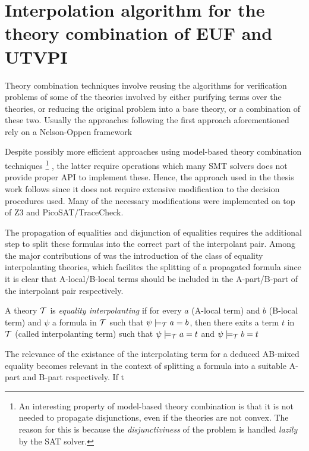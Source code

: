 \chapter{Interpolation algorithm for the theory combination of EUF and UTVPI}

Theory combination techniques involve 
reusing the algorithms for verification 
problems of some of the theories involved 
by either purifying terms over the 
theories, or reducing the original problem 
into a base theory, or a combination of these two. 
Usually the approaches following the first approach 
aforementioned rely on a Nelson-Oppen
framework \cite{10.1007/11532231_26, 
10.1007/978-3-642-22119-4_1, 10.1145/2490253}

Despite possibly more efficient approaches using
model-based theory combination techniques 
\footnote{
  An interesting property of model-based theory combination 
  is that it is not needed to propagate disjunctions, even if
  the theories are not convex. The reason for this is because
  the \emph{disjunctiviness} of the problem is handled 
  \emph{lazily} by the
  SAT solver.
} \cite{10.1007/978-3-642-22119-4_1}, the latter require 
operations which many SMT solvers does not provide 
proper API to implement these.
Hence, the approach used in the thesis work follows 
\cite{10.1007/11532231_26} since it does not require extensive
modification to the decision procedures
used. Many of the necessary modifications 
were implemented on top of Z3 and PicoSAT/TraceCheck.

The propagation of equalities and disjunction of equalities
requires the additional step to split these formulas into
the correct part of the interpolant pair. Among the major
contributions of \cite{10.1007/11532231_26} was the introduction
of the class of equality interpolanting theories, which
facilites the splitting of a propagated formula since
it is clear that A-local/B-local terms should be included in the
A-part/B-part of the interpolant pair respectively.

\begin{definition}
  A theory $\cal{T}$ is \emph{equality interpolanting}
  if for every $a$ (A-local term) and  $b$ (B-local term)
  and $\psi$ a formula in $\cal{T}$ such that
  $\psi \models_{\cal{T}} a = b$, then there exits a term $t$
  in $\cal{T}$ (called interpolanting term)
  such that $\psi \models_{\cal{T}} a = t$ and 
  $\psi \models_{\cal{T}} b = t$
\end{definition}

The relevance of the existance of the interpolating term for 
a deduced AB-mixed equality becomes relevant in the context 
of splitting a formula into a suitable A-part and B-part 
respectively. If t

